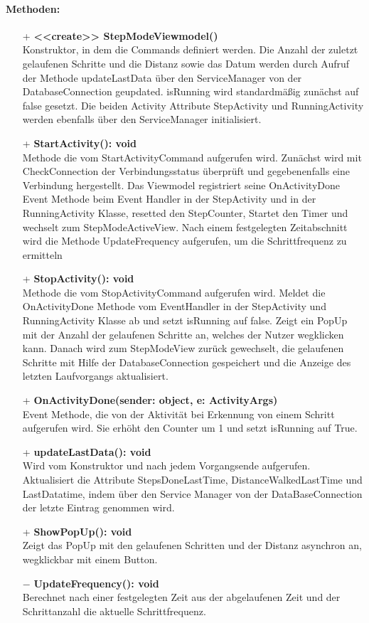 \documentclass[a4paper,12pt]{article}
\begin{document}
\paragraph{Methoden:}
\begin{itemize}
	\item[+] \textbf{<<create>> StepModeViewmodel()}\\ Konstruktor, in dem die Commands definiert werden. Die Anzahl der zuletzt gelaufenen Schritte und die Distanz sowie das Datum werden durch Aufruf der Methode updateLastData über den ServiceManager von der DatabaseConnection geupdated. isRunning wird standardmäßig zunächst auf false gesetzt. Die beiden Activity Attribute StepActivity und RunningActivity werden ebenfalls über den ServiceManager initialisiert.
	\item[+] \textbf{StartActivity(): void}\\ Methode die vom StartActivityCommand aufgerufen wird. Zunächst wird mit CheckConnection der Verbindungsstatus überprüft und gegebenenfalls eine Verbindung hergestellt. Das Viewmodel registriert seine OnActivityDone Event Methode beim Event Handler in der StepActivity und in der RunningActivity Klasse, resetted den StepCounter, Startet den Timer und wechselt zum StepModeActiveView. Nach einem festgelegten Zeitabschnitt wird die Methode UpdateFrequency aufgerufen, um die Schrittfrequenz zu ermitteln
	\item[+] \textbf {StopActivity(): void}\\ Methode die vom StopActivityCommand aufgerufen wird. Meldet die OnActivityDone Methode vom EventHandler in der StepActivity und RunningActivity Klasse ab und setzt isRunning auf false. Zeigt ein PopUp mit der Anzahl der gelaufenen Schritte an, welches der Nutzer wegklicken kann. Danach wird zum StepModeView zurück gewechselt, die gelaufenen Schritte mit Hilfe der DatabaseConnection gespeichert und die Anzeige des letzten Laufvorgangs aktualisiert. 
	\item[+] \textbf{OnActivityDone(sender: object, e: ActivityArgs)} \\ Event Methode, die von der Aktivität bei Erkennung von einem Schritt aufgerufen wird. Sie erhöht den Counter um 1 und setzt isRunning auf True. 
	\item[+] \textbf{updateLastData(): void} \\ Wird vom Konstruktor und nach jedem Vorgangsende aufgerufen. Aktualisiert die Attribute StepsDoneLastTime, DistanceWalkedLastTime und LastDatatime, indem über den Service Manager von der DataBaseConnection der letzte Eintrag genommen wird. 
	\item[+] \textbf{ShowPopUp(): void} \\ Zeigt das PopUp mit den gelaufenen Schritten und der Distanz asynchron an, wegklickbar mit einem Button. 
	\item[$-$] \textbf{UpdateFrequency(): void} \\ Berechnet nach einer festgelegten Zeit aus der abgelaufenen Zeit und der Schrittanzahl die aktuelle Schrittfrequenz.

\end{itemize}
\end{document}
